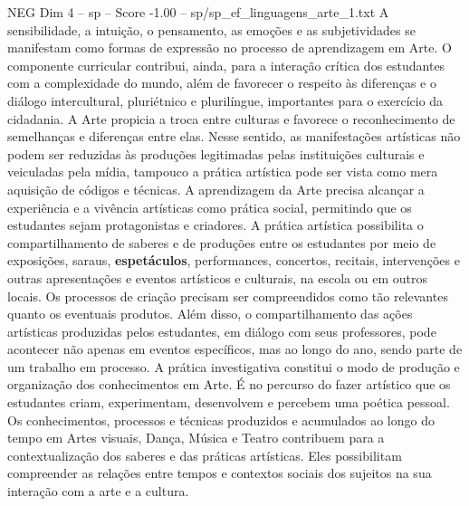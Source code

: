 \begin{textsample}{NEG Dim 4 – sp – Score -1.00 – sp/sp\_ef\_linguagens\_arte\_1.txt}
A sensibilidade, a intuição, o pensamento, as emoções e as subjetividades se manifestam como formas de expressão no processo de aprendizagem em Arte.
O componente curricular contribui, ainda, para a interação crítica dos estudantes com a complexidade do mundo, além de favorecer o respeito às diferenças e o diálogo intercultural, pluriétnico e plurilíngue, importantes para o exercício da cidadania.
A Arte propicia a troca entre culturas e favorece o reconhecimento de semelhanças e diferenças entre elas.
Nesse sentido, as manifestações artísticas não podem ser reduzidas às produções legitimadas pelas instituições culturais e veiculadas pela mídia, tampouco a prática artística pode ser vista como mera aquisição de códigos e técnicas.
A aprendizagem da Arte precisa alcançar a experiência e a vivência artísticas como prática social, permitindo que os estudantes sejam protagonistas e criadores.
A prática artística possibilita o compartilhamento de saberes e de produções entre os estudantes por meio de exposições, saraus, \textbf{espetáculos}, performances, concertos, recitais, intervenções e outras apresentações e eventos artísticos e culturais, na escola ou em outros locais.
Os processos de criação precisam ser compreendidos como tão relevantes quanto os eventuais produtos.
Além disso, o compartilhamento das ações artísticas produzidas pelos estudantes, em diálogo com seus professores, pode acontecer não apenas em eventos específicos, mas ao longo do ano, sendo parte de um trabalho em processo.
A prática investigativa constitui o modo de produção e organização dos conhecimentos em Arte.
É no percurso do fazer artístico que os estudantes criam, experimentam, desenvolvem e percebem uma poética pessoal.
Os conhecimentos, processos e técnicas produzidos e acumulados ao longo do tempo em Artes visuais, Dança, Música e Teatro contribuem para a contextualização dos saberes e das práticas artísticas.
Eles possibilitam compreender as relações entre tempos e contextos sociais dos sujeitos na sua interação com a arte e a cultura.

\end{textsample}
